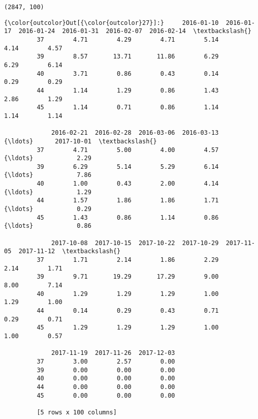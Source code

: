 \documentclass[11pt]{article}
\begin{document}
    \begin{Verbatim}[commandchars=\\\{\}]
(2847, 100)

    \end{Verbatim}

\begin{Verbatim}[commandchars=\\\{\}]
{\color{outcolor}Out[{\color{outcolor}27}]:}     2016-01-10  2016-01-17  2016-01-24  2016-01-31  2016-02-07  2016-02-14  \textbackslash{}
         37        4.71        4.29        4.71        5.14        4.14        4.57   
         39        8.57       13.71       11.86        6.29        6.29        6.14   
         40        3.71        0.86        0.43        0.14        0.29        0.29   
         44        1.14        1.29        0.86        1.43        2.86        1.29   
         45        1.14        0.71        0.86        1.14        1.14        1.14   
         
             2016-02-21  2016-02-28  2016-03-06  2016-03-13     {\ldots}      2017-10-01  \textbackslash{}
         37        4.71        5.00        4.00        4.57     {\ldots}            2.29   
         39        6.29        5.14        5.29        6.14     {\ldots}            7.86   
         40        1.00        0.43        2.00        4.14     {\ldots}            1.29   
         44        1.57        1.86        1.86        1.71     {\ldots}            0.29   
         45        1.43        0.86        1.14        0.86     {\ldots}            0.86   
         
             2017-10-08  2017-10-15  2017-10-22  2017-10-29  2017-11-05  2017-11-12  \textbackslash{}
         37        1.71        2.14        1.86        2.29        2.14        1.71   
         39        9.71       19.29       17.29        9.00        8.00        7.14   
         40        1.29        1.29        1.29        1.00        1.29        1.00   
         44        0.14        0.29        0.43        0.71        0.29        0.71   
         45        1.29        1.29        1.29        1.00        1.00        0.57   
         
             2017-11-19  2017-11-26  2017-12-03  
         37        3.00        2.57        0.00  
         39        0.00        0.00        0.00  
         40        0.00        0.00        0.00  
         44        0.00        0.00        0.00  
         45        0.00        0.00        0.00  
         
         [5 rows x 100 columns]
\end{Verbatim}
            
\end{document}
